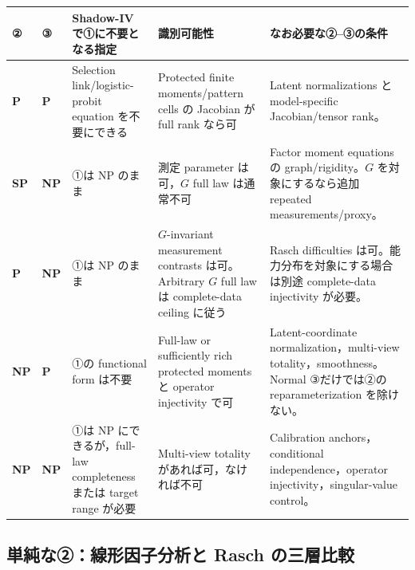 \documentclass[11pt,a4paper]{ltjsarticle}
\theoremstyle{remark}
\begin{document}
\begin{center}
\footnotesize
\begin{tabularx}{0.99\textwidth}{>{\bfseries}p{18mm}>{\bfseries}p{18mm}p{36mm}p{43mm}X}
\toprule
② & ③ & Shadow-IV で①に不要となる指定 & 識別可能性 & なお必要な②--③の条件\\
\midrule
P & P
& Selection link/logistic-probit equation を不要にできる
& Protected finite moments/pattern cells の Jacobian が full rank なら可
& Latent normalizations と model-specific Jacobian/tensor rank。\\
\addlinespace
SP & NP
& ①は NP のまま
& 測定 parameter は可，$G$ full law は通常不可
& Factor moment equations の graph/rigidity。$G$ を対象にするなら追加 repeated measurements/proxy。\\
\addlinespace
P & NP
& ①は NP のまま
& $G$-invariant measurement contrasts は可。Arbitrary $G$ full law は complete-data ceiling に従う
& Rasch difficulties は可。能力分布を対象にする場合は別途 complete-data injectivity が必要。\\
\addlinespace
NP & P
& ①の functional form は不要
& Full-law or sufficiently rich protected moments と operator injectivity で可
& Latent-coordinate normalization，multi-view totality，smoothness。Normal ③だけでは②の reparameterization を除けない。\\
\addlinespace
NP & NP
& ①は NP にできるが，full-law completeness または target range が必要
& Multi-view totality があれば可，なければ不可
& Calibration anchors，conditional independence，operator injectivity，singular-value control。\\
\bottomrule
\end{tabularx}
\end{center}

\subsection{単純な②：線形因子分析と Rasch の三層比較}
\end{document}
